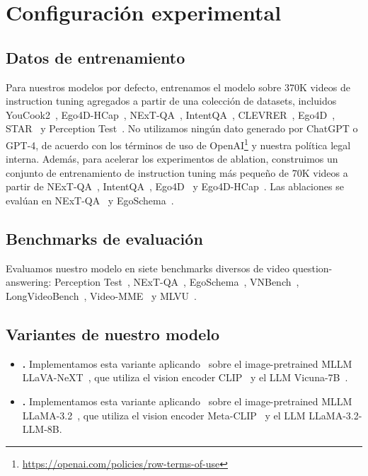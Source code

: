 \section{Configuración experimental}

\subsection{Datos de entrenamiento}


Para nuestros modelos por defecto, entrenamos el modelo sobre 370K videos de instruction tuning agregados a partir de una colección de datasets, incluidos YouCook2~\cite{zhou2018youcook2}, Ego4D-HCap~\cite{islam2024video}, NExT-QA~\cite{xiao2021nextqa}, IntentQA~\cite{li2023intentqa}, CLEVRER~\cite{yi2020clevrer}, Ego4D~\cite{Grauman2021Ego4DAT}, STAR~\cite{wu2024star} y Perception Test~\cite{patraucean2023perception}. No utilizamos ningún dato generado por ChatGPT o GPT-4, de acuerdo con los términos de uso de OpenAI\footnote{\href{https://openai.com/policies/row-terms-of-use}{https://openai.com/policies/row-terms-of-use}} y nuestra política legal interna. Además, para acelerar los experimentos de ablation, construimos un conjunto de entrenamiento de instruction tuning más pequeño de 70K videos a partir de NExT-QA~\cite{xiao2021nextqa}, IntentQA~\cite{li2023intentqa}, Ego4D~\cite{Grauman2021Ego4DAT} y Ego4D-HCap~\cite{islam2024video}. Las ablaciones se evalúan en NExT-QA~\cite{xiao2021nextqa} y EgoSchema~\cite{mangalam2023egoschema}.


\subsection{Benchmarks de evaluación}
Evaluamos nuestro modelo en siete benchmarks diversos de video question-answering: Perception Test~\cite{patraucean2024perception}, NExT-QA~\cite{xiao2021nextqa}, EgoSchema~\cite{mangalam2023egoschema}, VNBench~\cite{zhao2024needle}, LongVideoBench~\cite{wu2024longvideobench}, Video-MME~\citep{fu2024video} y MLVU~\cite{zhou2024mlvu}. 

\subsection{Variantes de nuestro modelo}
\begin{itemize}

\item \textbf{\modelLlava.} Implementamos esta variante aplicando \model\ sobre el image-pretrained MLLM LLaVA-NeXT~\cite{liu2024llavanext}, que utiliza el vision encoder CLIP~\cite{radford2021learning} y el LLM Vicuna-7B~\cite{vicuna2023}.  

\item \textbf{\modelLlama.} Implementamos esta variante aplicando \model\ sobre el image-pretrained MLLM LLaMA-3.2~\cite{llama3.2}, que utiliza el vision encoder Meta-CLIP~\cite{xu2023demystifying} y el LLM LLaMA-3.2-LLM-8B.

\end{itemize}

